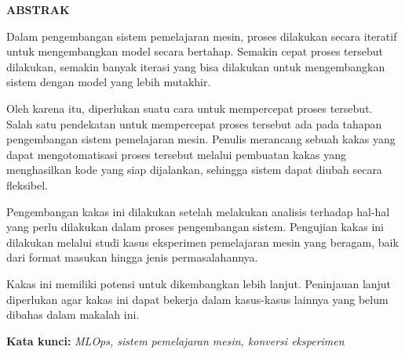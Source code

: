 \clearpage
{}
\begin{center}
  \textbf{\large \MakeUppercase{Abstrak}}\\[3em]
\end{center}

Dalam pengembangan sistem pemelajaran mesin, proses dilakukan secara iteratif untuk mengembangkan model secara bertahap.
Semakin cepat proses tersebut dilakukan, semakin banyak iterasi yang bisa dilakukan untuk mengembangkan sistem dengan model yang lebih mutakhir.

Oleh karena itu, diperlukan suatu cara untuk mempercepat proses tersebut.
Salah satu pendekatan untuk mempercepat proses tersebut ada pada tahapan pengembangan sistem pemelajaran mesin.
Penulis merancang sebuah kakas yang dapat mengotomatisasi proses tersebut melalui pembuatan kakas yang menghasilkan kode yang siap dijalankan, sehingga sistem dapat diubah secara fleksibel.

Pengembangan kakas ini dilakukan setelah melakukan analisis terhadap hal-hal yang perlu dilakukan dalam proses pengembangan sistem.
Pengujian kakas ini dilakukan melalui studi kasus eksperimen pemelajaran mesin yang beragam, baik dari format masukan hingga jenis permasalahannya.

Kakas ini memiliki potensi untuk dikembangkan lebih lanjut.
Peninjauan lanjut diperlukan agar kakas ini dapat bekerja dalam kasus-kasus lainnya yang belum dibahas dalam makalah ini.

\noindent \textbf{Kata kunci:}\newline
\emph{MLOps, sistem pemelajaran mesin, konversi eksperimen}
